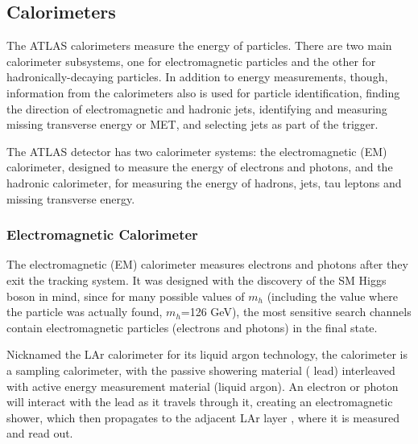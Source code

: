  


\subsection{Calorimeters}
The ATLAS calorimeters measure the energy of particles.  There are two main calorimeter
subsystems, one for electromagnetic particles and the other for hadronically-decaying particles.
In addition to energy measurements, though, information from the calorimeters also is used
for particle identification, finding the direction of electromagnetic and hadronic jets, 
identifying and measuring missing transverse energy or MET, and selecting jets as part of the
trigger.



The ATLAS detector has two calorimeter systems: the electromagnetic (EM) calorimeter, designed to measure the energy 
of electrons and photons, and the hadronic calorimeter, for measuring the energy of hadrons, jets, tau 
leptons and missing transverse energy.  

\subsubsection{Electromagnetic Calorimeter}
\label{sec:em_cal}

The electromagnetic (EM) calorimeter measures electrons and photons after they exit the tracking system. It was
designed with the discovery of the SM Higgs boson in mind, since for many possible values of $m_h$ (including 
the value where the particle was actually found, $m_h$=126 GeV), the most sensitive search channels contain 
electromagnetic particles (electrons and photons) in the final state. 

Nicknamed the LAr 
calorimeter for its liquid argon technology,  the calorimeter is a sampling calorimeter, with the passive showering material (
lead) interleaved with active energy measurement material (liquid argon).  An electron or photon will interact with the 
lead as it travels through it, creating an electromagnetic shower, which then propagates to the adjacent LAr layer
, where it is measured and read out.


